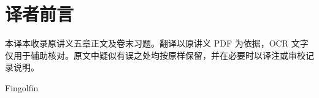 \documentclass[BookTitleCN={数论},OriginalAuthor={Jean-François Dat},OriginalYear={2012-2013},Translator={Fingolfin},TranslationDate={2026年10月25日},ModelUsed={Codex},BibStyle=numeric]{mathtranslation}
\begin{document}
\hypersetup{pageanchor=false}
\makecover
\cleardoublepage
\hypersetup{pageanchor=true}
\frontmatter
\chapter*{译者前言}
本译本收录原讲义五章正文及卷末习题。翻译以原讲义 PDF 为依据，OCR 文字仅用于辅助核对。原文中疑似有误之处均按原样保留，并在必要时以译注或审校记录说明。
\par\medskip\hfill Fingolfin
\makecontents
\mainmatter





\backmatter
\printterminology
\end{document}
